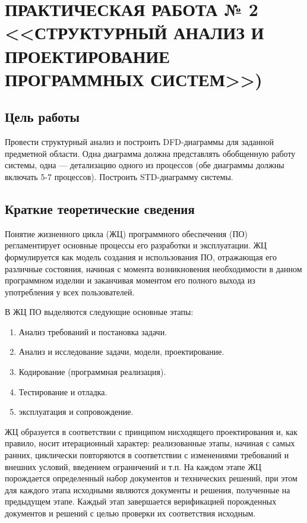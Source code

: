 \chapter{ПРАКТИЧЕСКАЯ РАБОТА № 2 <<СТРУКТУРНЫЙ АНАЛИЗ И ПРОЕКТИРОВАНИЕ ПРОГРАММНЫХ СИСТЕМ>>)}

\section{Цель работы}

Провести структурный анализ и построить DFD-диаграммы для заданной предметной области. Одна диаграмма должна представлять обобщенную работу системы, одна --- детализацию одного из процессов (обе диаграммы должны включать 5-7 процессов). Построить STD-диаграмму системы.

\section{Краткие теоретические сведения}

Понятие жизненного цикла (ЖЦ) программного обеспечения (ПО) регламентирует основные процессы его разработки и эксплуатации. ЖЦ формулируется как модель создания и использования ПО, отражающая его различные состояния, начиная с момента возникновения необходимости в данном программном изделии и заканчивая моментом его полного выхода из употребления у всех пользователей.

В  ЖЦ ПО выделяются следующие основные этапы:

\begin{enumerate}
	\item{Анализ требований и постановка задачи.}
	\item{Анализ и исследование задачи, модели, проектирование.}
	\item{Кодирование (программная реализация).}
	\item{Тестирование и отладка.}
	\item{эксплуатация и сопровождение.}
\end{enumerate}

ЖЦ образуется в соответствии с принципом нисходящего проектирования и, как правило, носит итерационный характер: реализованные этапы, начиная с самых ранних, циклически повторяются в соответствии с изменениями требований и внешних условий, введением ограничений и т.п. На каждом этапе ЖЦ порождается определенный набор документов и технических решений, при этом для каждого этапа исходными являются документы и решения, полученные на предыдущем этапе. Каждый этап завершается верификацией порожденных документов и решений с целью проверки их соответствия исходным.

